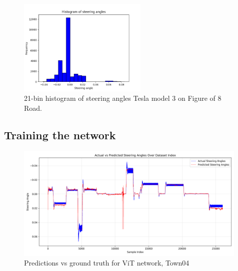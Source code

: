 
\begin{figure}[h]
    \centering
    \includegraphics[width=0.55\textwidth]{Figures/Methods/steering_angle_histogram.png}
    \caption{21-bin histogram of steering angles Tesla model 3 on Figure of 8 Road.}
    \label{fig:/steering_angle_histogram}
\end{figure}

\subsection{Training the network}



\begin{figure}[h]
    \centering
    \includegraphics[width=0.99\textwidth]{Figures/Methods/predictions_vs_labels_vit.png}
    \caption{Predictions vs ground truth for ViT network, Town04}
    \label{fig:/predictions_vs_labels_vit}
\end{figure}

